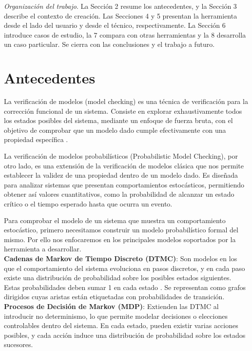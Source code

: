 \documentclass[runningheads]{llncs}
\begin{document}
\textit{Organización del trabajo}. La Sección 2 resume los antecedentes, y la Sección 3 describe el contexto de creación. Las Secciones 4 y 5 presentan la herramienta desde el lado del usuario y desde el técnico, respectivamente. La Sección 6 introduce casos de estudio, la 7 compara con otras herramientas y la 8 desarrolla un caso particular. Se cierra con las conclusiones y el trabajo a futuro.

\section{Antecedentes}
La verificación de modelos (model checking) es una técnica de verificación para la corrección funcional de un sistema. Consiste en explorar exhaustivamente todos los estados posibles del sistema, mediante un enfoque de fuerza bruta, con el objetivo de comprobar que un modelo dado cumple efectivamente con una propiedad específica \cite{BK07}. 

La verificación de modelos probabilísticos (Probabilistic Model Checking), por otro lado, es una extensión de la verificación de modelos clásica que nos permite establecer la validez de una propiedad dentro de un modelo dado. Es diseñada para analizar sistemas que presentan comportamientos estocásticos, permitiendo obtener así valores cuantitativos, como la probabilidad de alcanzar un estado crítico o el tiempo esperado hasta que ocurra un evento.

Para comprobar el modelo de un sistema que muestra un comportamiento estocástico, primero necesitamos construir un modelo probabilístico formal del mismo. Por ello nos enfocaremos en los principales modelos soportados por la herramienta a desarrollar.\\

\textbf{Cadenas de Markov de Tiempo Discreto (DTMC)}: Son modelos en los que el comportamiento del sistema evoluciona en pasos discretos, y en cada paso existe una distribución de probabilidad sobre los posibles estados siguientes. Estas probabilidades deben sumar 1 en cada estado \cite{KNP02}. Se representan como grafos dirigidos cuyas aristas están etiquetadas con probabilidades de transición.\\

\textbf{Procesos de Decisión de Markov (MDP)}: Extienden las DTMC al introducir no determinismo, lo que permite modelar decisiones o elecciones controlables dentro del sistema. En cada estado, pueden existir varias acciones posibles, y cada acción induce una distribución de probabilidad sobre los estados sucesores.\\
\end{document}
